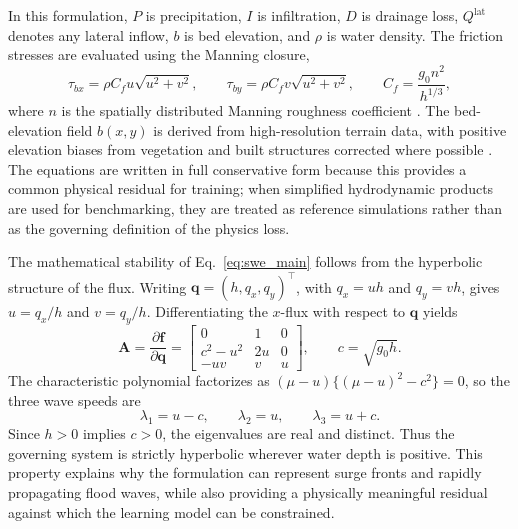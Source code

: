 \documentclass[pdflatex,sn-mathphys-ay]{sn-jnl}
\theoremstyle{thmstyleone}
\theoremstyle{thmstylethree}
\theoremstyle{thmstyletwo}
\begin{document}
In this formulation, $P$ is precipitation, $I$ is infiltration, $D$ is
drainage loss, $Q^{\mathrm{lat}}$ denotes any lateral inflow, $b$ is
bed elevation, and $\rho$ is water density.  The friction stresses are
evaluated using the Manning closure,
\begin{equation}
  \tau_{bx}
  =
  \rho C_f u\sqrt{u^2+v^2},
  \qquad
  \tau_{by}
  =
  \rho C_f v\sqrt{u^2+v^2},
  \qquad
  C_f
  =
  \frac{g_{0}n^2}{h^{1/3}},
  \label{eq:manning}
\end{equation}
where $n$ is the spatially distributed Manning roughness coefficient
\citep{Almeida2013,Xia2017}.  The bed-elevation field $b(x,y)$ is
derived from high-resolution terrain data, with positive elevation
biases from vegetation and built structures corrected where possible
\citep{Farr2007,Hawker2022}.  The equations are written in full
conservative form because this provides a common physical residual for
training; when simplified hydrodynamic products are used for
benchmarking, they are treated as reference simulations rather than as
the governing definition of the physics loss.

The mathematical stability of Eq.~\eqref{eq:swe_main} follows from
the hyperbolic structure of the flux.  Writing
$\mathbf{q}=(h,q_x,q_y)^\top$, with $q_x=uh$ and $q_y=vh$, gives
$u=q_x/h$ and $v=q_y/h$.  Differentiating the $x$-flux with respect to
$\mathbf{q}$ yields
\begin{equation}
  \mathbf{A}
  =
  \frac{\partial\mathbf{f}}{\partial\mathbf{q}}
  =
  \begin{bmatrix}
    0 & 1 & 0 \\
    c^{2}-u^{2} & 2u & 0 \\
    -uv & v & u
  \end{bmatrix},
  \qquad
  c=\sqrt{g_{0}h}.
  \label{eq:jacobian}
\end{equation}
The characteristic polynomial factorizes as
$(\mu-u)\{(\mu-u)^2-c^2\}=0$, so the three wave speeds are
\begin{equation}
  \lambda_1=u-c,
  \qquad
  \lambda_2=u,
  \qquad
  \lambda_3=u+c.
  \label{eq:eigenvalues}
\end{equation}
Since $h>0$ implies $c>0$, the eigenvalues are real and distinct.
Thus the governing system is strictly hyperbolic wherever water depth
is positive.  This property explains why the formulation can represent
surge fronts and rapidly propagating flood waves, while also providing
a physically meaningful residual against which the learning model can
be constrained.
\end{document}
